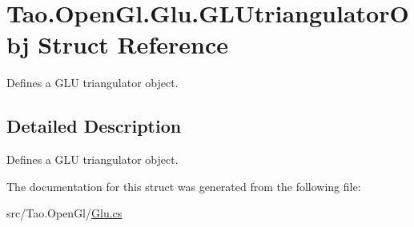 \hypertarget{struct_tao_1_1_open_gl_1_1_glu_1_1_g_l_utriangulator_obj}{
\section{Tao.OpenGl.Glu.GLUtriangulatorObj Struct Reference}
\label{struct_tao_1_1_open_gl_1_1_glu_1_1_g_l_utriangulator_obj}
}


Defines a GLU triangulator object.  




\subsection{Detailed Description}
Defines a GLU triangulator object. 

The documentation for this struct was generated from the following file:\begin{DoxyCompactItemize}
\item 
src/Tao.OpenGl/\hyperlink{_glu_8cs}{Glu.cs}\end{DoxyCompactItemize}
